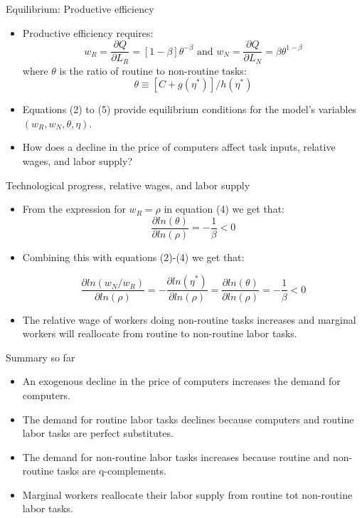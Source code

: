 \documentclass[notes=show]{beamer}
\begin{document}
\begin{frame}{Equilibrium: Productive efficiency}
\begin{itemize}
\item Productive efficiency requires:
\[
w_{R} = \frac{ \partial Q}{ \partial L_{R}}=[1- \beta] \theta^{-\beta} \text{ and } w_{N} = \frac{ \partial Q}{\partial L_{N}}= \beta \theta^{1-\beta} \tag{4}  \label{eq4}
\]
where $ \theta $ is the ratio of routine to non-routine tasks:
\[
\theta \equiv [C+g(\eta^{*})]/h( \eta^{*}) \tag{5}  \label{eq5}
\]
\item Equations (2) to (5) provide equilibrium conditions for the model's variables $(w_{R},w_{N}, \theta, \eta)$. \medskip
\item How does a decline in the price of computers affect task inputs, relative wages, and labor supply?
\end{itemize}
\end{frame}

\begin{frame}{Technological progress, relative wages, and labor supply}
\begin{itemize}
\item From the expression for $w_{R} = \rho$ in equation (4) we get that:
\[
\frac{\partial ln(\theta)}{\partial ln(\rho)} = - \frac{1}{\beta} < 0
\]
\item Combining this with equations (2)-(4) we get that:
\begin{tcolorbox}
\[
\frac{\partial ln (w_{N}/w_{R})}{\partial ln(\rho)} = - \frac{\partial ln(\eta^{*})}{\partial ln(\rho)} = \frac{\partial ln(\theta)}{\partial ln(\rho)} = - \frac{1}{\beta} < 0 \tag{7}  \label{eq7}
\]
\end{tcolorbox}
\item The relative wage of workers doing non-routine tasks increases and marginal workers will reallocate from routine to non-routine labor tasks.
\end{itemize}
\end{frame}

\begin{frame}{Summary so far}
\begin{itemize}
\item An exogenous decline in the price of computers increases the demand for computers. \medskip
\item The demand for routine labor tasks declines because computers and routine labor tasks are perfect substitutes. \medskip
\item The demand for non-routine labor tasks increases because routine and non-routine tasks are q-complements. \medskip
\item Marginal workers reallocate their labor supply from routine tot non-routine labor tasks.
\end{itemize}
\end{frame}
\end{document}
